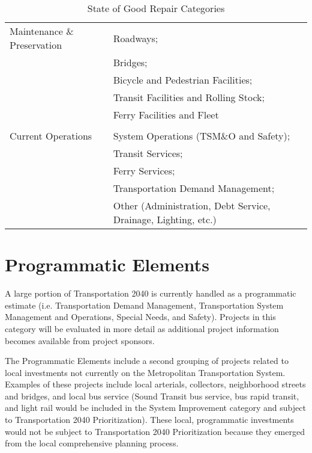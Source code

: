 \documentclass[10pt, letterpaper, final, twoside, onecolumn]{memoir}%
\begin{document}
\begin{table}[htdp]
\caption{State of Good Repair Categories}
\begin{center}
\begin{tabularx}{0.9\textwidth}{>{\raggedright\arraybackslash}p{11pc}>{\raggedright\arraybackslash}X}
\toprule

Maintenance \& Preservation	&	Roadways; \\
&	Bridges; \\
&	Bicycle and Pedestrian Facilities; \\
&	Transit Facilities and Rolling Stock; \\
&	Ferry Facilities and Fleet \\
\\
Current Operations	&	System Operations (TSM\&O and Safety); \\
&	Transit Services; \\
&	Ferry Services; \\
&	Transportation Demand Management; \\
&	Other (Administration, Debt Service, Drainage, Lighting, etc.) \\

\bottomrule
\end{tabularx}
\end{center}
\label{default}
\end{table}%

\section{Programmatic Elements}

A large portion of Transportation 2040 is currently handled as a programmatic estimate (i.e. Transportation Demand Management, Transportation System Management and Operations, Special Needs, and Safety). Projects in this category will be evaluated in more detail as additional project information becomes available from project sponsors.

The Programmatic Elements include a second grouping of projects related to local investments not currently on the Metropolitan Transportation System. Examples of these projects include local arterials, collectors, neighborhood streets and bridges, and local bus service (Sound Transit bus service, bus rapid transit, and light rail would be included in the System Improvement category and subject to Transportation 2040 Prioritization). These local, programmatic investments would not be subject to Transportation 2040 Prioritization because they emerged from the local comprehensive planning process.
\end{document}
